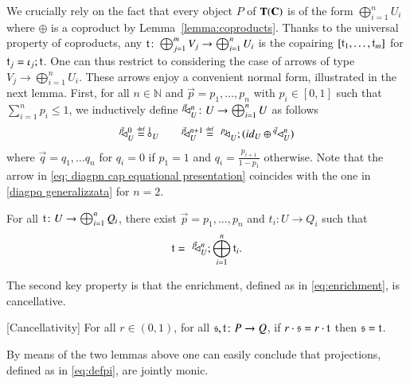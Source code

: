 We crucially rely on the fact that every object $P$ of $\mathbf{T}(\mathbf{C})$ is of the form $\bigoplus_{i=1}^nU_i$ where $\oplus$ is a coproduct by Lemma~\ref{lemma:coproducts}. Thanks to the universal property of coproducts, any $\mathfrak{t}\colon\bigoplus_{j=1}^mV_j \to \bigoplus_{i=1}^nU_i$ is the copairing $[\mathfrak{t}_1, \dots, \mathfrak{t}_m]$ for $\mathfrak{t}_j=\iota_j; \mathfrak{t}$. One can thus restrict to considering the case of arrows of type $ V_j \to \bigoplus_{i=1}^nU_i$. These arrows enjoy a convenient normal form, illustrated in the next lemma. First, for all $n\in \mathbb{N}$ and $\vec{p}=p_1,\dots ,p_n$ with $p_i\in[0,1]$ such that $\sum_{i=1}^n p_i\leq 1$, we inductively define $^{\vec{p}\;}\!\!\! \lhd_{U}^{n} \colon U \to \bigoplus_{i=1}^nU$ as follows
\begin{equation}\label{eq: diagpn cap equational presentation}
\diagpn{\vec{p}\;}{U}{0}\defeq \bang{U} \qquad \diagpn{\vec{p}\;}{U}{n+1}\defeq\, \diagpn{\;p_{1}}{U}{}; (\id{U} \oplus \diagpn{\;\vec{q}\;}{U}{n})
\end{equation}
where $\vec{q}=q_1,\dots q_{n}$ for $q_i=0$ if $p_{1}= 1$ and $q_i=\frac{p_{i+1}}{1-p_{1}}$ otherwise. Note that the arrow in \eqref{eq: diagpn cap equational presentation} coincides with the one in \eqref{diagpq generalizzata} for $n=2$.
\begin{lemma}\label{decomposition}
For all $\mathfrak{t}\colon U \to \bigoplus_{i=1}^n Q_i$, there exist $\vec{p}=p_1,\dots ,p_n$ and $t_i\colon U \to Q_i$ such that \[\mathfrak{t}=\,^{\;\vec{p}\;}\!\!\! \lhd_{U}^{n}; \bigoplus_{i=1}^n \mathfrak{t}_i\text{.}\]
\end{lemma}

The second key property is that the enrichment, defined as in \eqref{eq:enrichment}, is cancellative.

\begin{lemma}\label{cancellativity}[Cancellativity]
For all $r\in (0,1)$, for all $\mathfrak{s},\mathfrak{t} \colon P \to Q$, 
if $r\cdot \mathfrak{s} = r\cdot \mathfrak{t}$ then $\mathfrak{s} = \mathfrak{t}$.
\end{lemma}

By means of the two lemmas above one can easily conclude that projections, defined as in \eqref{eq:defpi}, are jointly monic.

